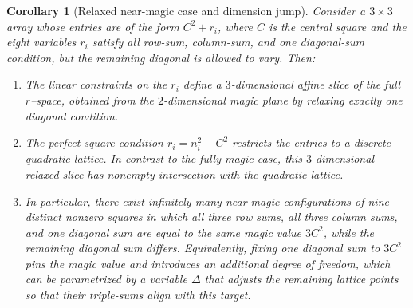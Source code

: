 \documentclass[12pt]{article}
\newtheorem{corollary}{Corollary}
\begin{document}
\begin{corollary}[Relaxed near-magic case and dimension jump]
Consider a $3\times 3$ array whose entries are of the form $C^2 + r_i$, where
$C$ is the central square and the eight variables $r_i$ satisfy all row-sum,
column-sum, and one diagonal-sum condition, but the remaining diagonal is
allowed to vary.  Then:

\begin{enumerate}
  \item The linear constraints on the $r_i$ define a $3$-dimensional affine
  slice of the full $r$--space, obtained from the $2$-dimensional magic plane
  by relaxing exactly one diagonal condition.

  \item The perfect-square condition $r_i = n_i^2 - C^2$ restricts the entries
  to a discrete quadratic lattice.  In contrast to the fully magic case, this
  $3$-dimensional relaxed slice has nonempty intersection with the quadratic
  lattice.

  \item In particular, there exist infinitely many near-magic configurations of
  nine distinct nonzero squares in which all three row sums, all three column
  sums, and one diagonal sum are equal to the same magic value $3C^2$, while
  the remaining diagonal sum differs.  Equivalently, fixing one diagonal sum
  to $3C^2$ pins the magic value and introduces an additional degree of
  freedom, which can be parametrized by a variable $\Delta$ that adjusts the
  remaining lattice points so that their triple-sums align with this target.
\end{enumerate}
\end{corollary}
\end{document}
